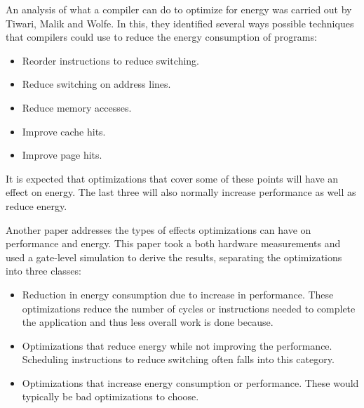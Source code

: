\documentclass[twocolumn]{article}
\begin{document}
An analysis of what a compiler can do to optimize for energy was carried out by Tiwari, Malik and Wolfe\cite{CompilationTechniquesForLowEnergy}. In this, they identified several ways possible techniques that compilers could use to reduce the energy consumption of programs:
\begin{itemize}
	\setlength{\itemsep}{0em}
	\vspace{-1mm}

	\item Reorder instructions to reduce switching.
	\item Reduce switching on address lines.
	\item Reduce memory accesses.
	\item Improve cache hits.
	\item Improve page hits.
\end{itemize}

It is expected that optimizations that cover some of these points will have an effect on energy. The last three will also normally increase performance as well as reduce energy.

Another paper addresses the types of effects optimizations can have on performance and energy\cite{WhatCanAPoorCompilerDo}. This paper took a both hardware measurements and used a gate-level simulation to derive the results,  separating the optimizations into three classes:
\begin{itemize}
	\setlength{\itemsep}{0em}
	\vspace{-1mm}
	\item Reduction in energy consumption due to increase in performance. These optimizations reduce the number of cycles or instructions needed to complete the application and thus less overall work is done because.
	\item Optimizations that reduce energy while not improving the performance. Scheduling instructions to reduce switching often falls into this category.
	\item Optimizations that increase energy consumption or performance. These would typically be bad optimizations to choose.
\end{itemize}
\end{document}
